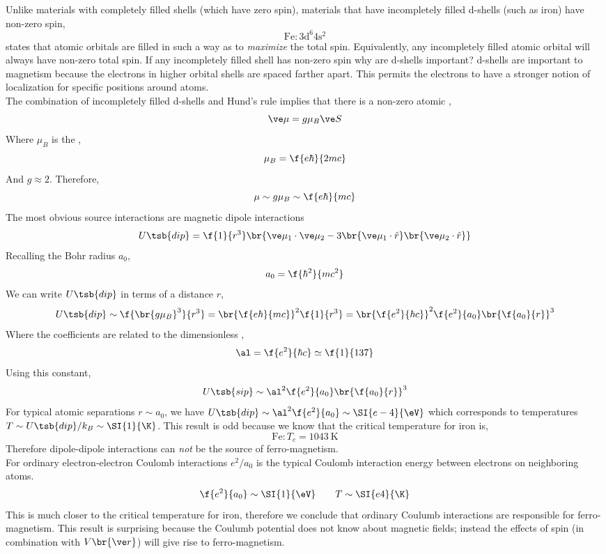 \documentclass{article}
\begin{document}
Unlike materials with completely filled shells (which have zero spin), materials that have incompletely filled d-shells (such as iron) have non-zero spin,
\[ \text{Fe} : 3 \text{d}^{6} 4\text{s}^2 \]
 states that atomic orbitals are filled in such a way as to \textit{maximize} the total spin. Equivalently, any incompletely filled atomic orbital will always have non-zero total spin. If any incompletely filled shell has non-zero spin why are d-shells important? d-shells are important to magnetism because the electrons in higher orbital shells are spaced farther apart. This permits the electrons to have a stronger notion of localization for specific positions around atoms. \\

The combination of incompletely filled d-shells and Hund's rule implies that there is a non-zero atomic ,
\[ \ve \mu = g \mu_{B} \ve S \]
Where $\mu_B$ is the ,
\[ \mu_{B} = \f{e\hbar}{2 mc} \]
And $g \approx 2$. Therefore,
\[ \mu \sim g \mu_B \sim \f{e\hbar}{mc} \]
The most obvious source interactions are magnetic dipole interactions
\[ U\tsb{dip} = \f{1}{r^3} \br{\ve \mu_1 \cdot \ve \mu_2 - 3 \br{\ve \mu_1 \cdot \hat r}\br{\ve \mu_2 \cdot \hat r}} \]
Recalling the Bohr radius $a_{0}$,
\[ a_{0} = \f{\hbar^2}{m c^2} \]
We can write $U\tsb{dip}$ in terms of a distance $r$,
\[ U\tsb{dip} \sim \f{\br{g\mu_B}^3}{r^3} = \br{\f{e\hbar}{mc}}^2 \f{1}{r^3} = \br{\f{e^2}{\hbar c}}^2 \f{e^2}{a_0} \br{\f{a_0}{r}}^3 \]
Where the coefficients are related to the dimensionless ,
\[ \al = \f{e^2}{\hbar c} \simeq \f{1}{137} \]
Using this constant,
\[ U\tsb{sip} \sim \al^2 \f{e^2}{a_0} \br{\f{a_0}{r}}^3 \]
For typical atomic separations $r \sim a_0$, we have $U\tsb{dip} \sim \al^2 \f{e^2}{a_0} \sim \SI{e-4}{\eV}$ which corresponds to temperatures $T \sim U\tsb{dip}/k_B \sim \SI{1}{\K}$. This result is odd because we know that the critical temperature for iron is,
\[ \text{Fe} : T_c = \SI{1043}{\K} \]
Therefore dipole-dipole interactions can \textit{not} be the source of ferro-magnetism. \\

For ordinary electron-electron Coulomb interactions $e^2 / a_0$ is the typical Coulomb interaction energy between electrons on neighboring atoms.
\[ \f{e^2}{a_0} \sim \SI{1}{\eV} \qquad T \sim \SI{e4}{\K} \]
This is much closer to the critical temperature for iron, therefore we conclude that ordinary Coulumb interactions are responsible for ferro-magnetism. This result is surprising because the Coulumb potential does not know about magnetic fields; instead the effects of spin (in combination with $V\br{\ve r}$) will give rise to ferro-magnetism. \\
\end{document}
